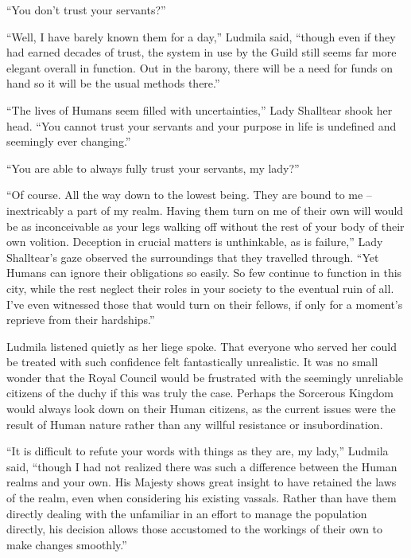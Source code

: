  

“You don’t trust your servants?”

 

“Well, I have barely known them for a day,” Ludmila said, “though even if they had earned decades of trust, the system in use by the Guild still seems far more elegant overall in function. Out in the barony, there will be a need for funds on hand so it will be the usual methods there.”

 

“The lives of Humans seem filled with uncertainties,” Lady Shalltear shook her head. “You cannot trust your servants and your purpose in life is undefined and seemingly ever changing.”

 

“You are able to always fully trust your servants, my lady?”

 

“Of course. All the way down to the lowest being. They are bound to me – inextricably a part of my realm. Having them turn on me of their own will would be as inconceivable as your legs walking off without the rest of your body of their own volition. Deception in crucial matters is unthinkable, as is failure,” Lady Shalltear’s gaze observed the surroundings that they travelled through. “Yet Humans can ignore their obligations so easily. So few continue to function in this city, while the rest neglect their roles in your society to the eventual ruin of all. I’ve even witnessed those that would turn on their fellows, if only for a moment’s reprieve from their hardships.”

 

Ludmila listened quietly as her liege spoke. That everyone who served her could be treated with such confidence felt fantastically unrealistic. It was no small wonder that the Royal Council would be frustrated with the seemingly unreliable citizens of the duchy if this was truly the case. Perhaps the Sorcerous Kingdom would always look down on their Human citizens, as the current issues were the result of Human nature rather than any willful resistance or insubordination.

 

“It is difficult to refute your words with things as they are, my lady,” Ludmila said, “though I had not realized there was such a difference between the Human realms and your own. His Majesty shows great insight to have retained the laws of the realm, even when considering his existing vassals. Rather than have them directly dealing with the unfamiliar in an effort to manage the population directly, his decision allows those accustomed to the workings of their own to make changes smoothly.”

